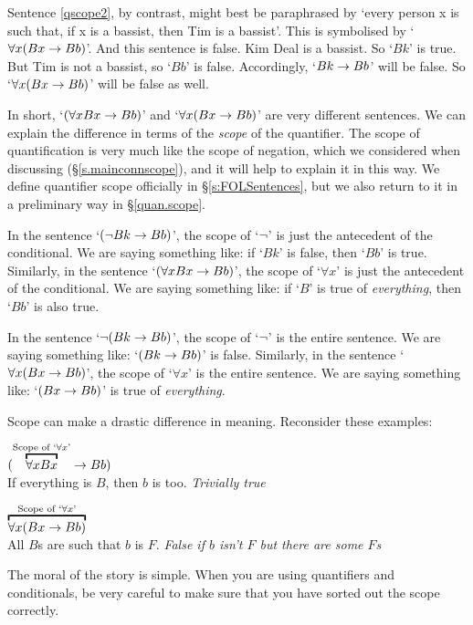 Sentence \ref{qscope2}, by contrast, might best be paraphrased by `every person x is such that, if x is a bassist, then Tim is a bassist'. This is symbolised by `$\forall x (Bx \rightarrow Bb)$'. And this sentence is false. Kim Deal is a bassist. So `$Bk$' is true. But Tim is not a bassist, so `$Bb$' is false. Accordingly, `$Bk \rightarrow Bb$' will be false. So `$\forall x (Bx \rightarrow Bb)$' will be false as well. 

In short, `$(\forall x Bx \rightarrow Bb)$' and `$\forall x (Bx \rightarrow Bb)$' are very different sentences. We can explain the difference in terms of the \emph{scope} of the quantifier.  The scope of quantification is very much like the scope of negation, which we considered when discussing \TFL (§\ref{s.mainconnscope}), and it will help to explain it in this way. We define quantifier scope officially in §\ref{s:FOLSentences}, but we also return to it in a preliminary way in §\ref{quan.scope}.

In the sentence `$(\neg Bk \rightarrow Bb)$', the scope of `$\neg$' is just the antecedent of the conditional. We are saying something like: if `$Bk$' is false, then `$Bb$' is true. Similarly, in the sentence `$(\forall x Bx \rightarrow Bb)$', the scope of `$\forall x$' is just the antecedent of the conditional. We are saying something like: if `$B$' is true of \emph{everything}, then `$Bb$' is also true. 

In the sentence `$\neg(Bk \rightarrow Bb)$', the scope of `$\neg$' is the entire sentence. We are saying something like: `$(Bk \rightarrow Bb)$' is false. Similarly, in the sentence `$\forall x (Bx \rightarrow Bb)$', the scope of `$\forall x$' is the entire sentence. We are saying something like: `$(Bx \rightarrow Bb)$' is true of \emph{everything}.

Scope can make a drastic difference in meaning. Reconsider these examples:
\begin{earg}
    			\item[\ex{ben1}] $(\overbracket{\forall x Bx}^{\text{Scope of `$\forall x$'}}\eif Bb)$\\ If everything is $B$, then $b$ is too. \emph{Trivially true}
    			\item[\ex{ben2}] $\overbracket{\forall x (Bx \eif Bb)}^{\text{Scope of `$\forall x$'}}$\\ All $B$s are such that $b$ is $F$. \emph{False if $b$ isn't $F$ but there are some $F$s}
    		\end{earg}

The moral of the story is simple. When you are using quantifiers and conditionals, be very careful to make sure that you have sorted out the scope correctly. 

